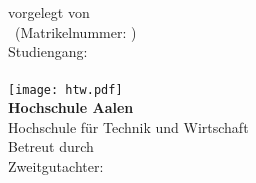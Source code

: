 \begin{titlepage}
    \centering%
    \vspace*{\fill}%
    \linespread{1.2}
    \sffamily
    \textbf{\huge{\Course}}\\[1.2cm]
    \large{\textbf{\Subject}}\\[1.2cm]
    vorgelegt von\\[1.2cm]
    \Author\ (Matrikelnummer: \Matriculation)\\[1.0cm]
    Studiengang: \Discipline\\
    \Semester\\[0.2cm]
    \texttt{[image: htw.pdf]}\\[0.1cm]
    \textbf{Hochschule Aalen}\\[0.2cm]
    Hochschule für Technik und Wirtschaft\\[0.2cm]
    Betreut durch \Professor\\[0.2cm]
    Zweitgutachter: \CoProfessor\\[0.2cm]
    \Deadline%
    \vspace*{\fill}%
\end{titlepage}
\restoregeometry%
